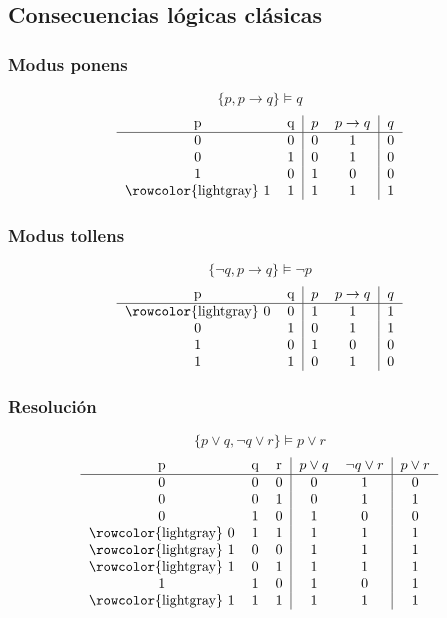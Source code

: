 \documentclass{article}
\begin{document}
\subsection{Consecuencias lógicas clásicas}
\subsubsection{Modus ponens}
$$ \{ p, p \rightarrow{} q \} \models{} q $$
\[
    \begin{tabular}{cc|cc|c}
        p & q & $p$ & $p \rightarrow{} q$ & $q$ \\ \hline
        0 & 0 & 0 & 1 & 0 \\
        0 & 1 & 0 & 1 & 0 \\
        1 & 0 & 1 & 0 & 0 \\
        \rowcolor{lightgray} 1 & 1 & 1 & 1 & 1 \\
    \end{tabular}
\]

\subsubsection{Modus tollens}
$$\{ \neg{} q, p \rightarrow q \} \models{} \neg{} p$$
\[
    \begin{tabular}{cc|cc|c}
        p & q & $p$ & $p \rightarrow{} q$ & $q$ \\ \hline
        \rowcolor{lightgray} 0 & 0 & 1 & 1 & 1 \\
        0 & 1 & 0 & 1 & 1 \\
        1 & 0 & 1 & 0 & 0 \\
        1 & 1 & 0 & 1 & 0 \\
    \end{tabular}
\]

\subsubsection{Resolución}
$$\{ p \vee{} q, \neg{} q \vee{} r \} \models{} p \vee{} r$$
\[
    \begin{tabular}{ccc|cc|c}
        p & q & r & $p \vee{} q$ & $\neg{} q \vee{} r$ & $p \vee{} r$ \\ \hline
        0 & 0 & 0 & 0 & 1 & 0\\
        0 & 0 & 1 & 0 & 1 & 1\\
        0 & 1 & 0 & 1 & 0 & 0\\
        \rowcolor{lightgray} 0 & 1 & 1 & 1 & 1 & 1\\
        \rowcolor{lightgray} 1 & 0 & 0 & 1 & 1 & 1\\
        \rowcolor{lightgray} 1 & 0 & 1 & 1 & 1 & 1\\
        1 & 1 & 0 & 1 & 0 & 1\\
        \rowcolor{lightgray} 1 & 1 & 1 & 1 & 1 & 1\\
    \end{tabular}
\]
\end{document}
